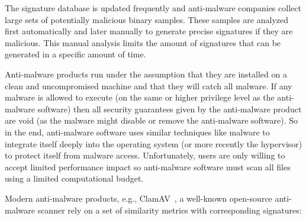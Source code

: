\documentclass[10pt, preprint]{sigplanconf}
\begin{document}
The signature database is updated frequently and anti-malware companies collect
large sets of potentially malicious binary samples. These samples are analyzed
first automatically and later manually to generate precise signatures if they
are malicious. This manual analysis limits the amount of signatures that can be
generated in a specific amount of time.

Anti-malware products run under the assumption that they are installed on a
clean and uncompromised machine and that they will catch all malware. If
any malware is allowed to execute (on the same or higher privilege level
as the anti-malware software) then all security guarantees given by the
anti-malware product are void (as the malware might disable or remove
the anti-malware software). So in the end, anti-malware software uses
similar techniques like malware to integrate itself deeply into the
operating system (or more recently the hypervisor) to protect itself
from malware access. Unfortunately, users are only willing to accept
limited performance impact so anti-malware software must scan all files
using a limited computational budget.

Modern anti-malware products, e.g., ClamAV~\cite{clamav}, a well-known
open-source anti-malware scanner rely on a set of similarity metrics with
corresponding signatures:
\end{document}

